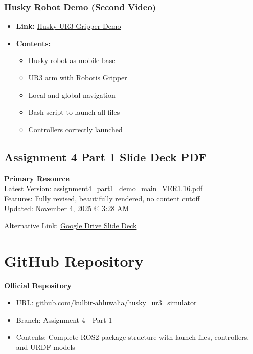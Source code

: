 \documentclass[11pt,a4paper]{article}
\begin{document}
\subsubsection{Husky Robot Demo (Second Video)}
\begin{itemize}
    \item \textbf{Link:} \href{https://drive.google.com/file/d/1FVhyBrrrvM0TzXG092dVYTzzvB7eGf9Y/view?usp=sharing}{Husky UR3 Gripper Demo}
    \item \textbf{Contents:}
    \begin{itemize}[nosep]
        \item Husky robot as mobile base
        \item UR3 arm with Robotis Gripper
        \item Local and global navigation
        \item Bash script to launch all files
        \item Controllers correctly launched
    \end{itemize}
\end{itemize}

\subsection{Assignment 4 Part 1 Slide Deck PDF}

\begin{warningbox}
\textbf{Primary Resource}\\
Latest Version: \href{https://files.campuswire.com/e08a84bd-8041-4768-9519-4e549f2b26e8/d555c87a-c092-4ebc-8ce1-97fc9bfbec64/assignment4_part1_demo_main_VER1.16_PDF_ASSIGNMENT4.pdf}{assignment4\_part1\_demo\_main\_VER1.16.pdf}\\
Features: Fully revised, beautifully rendered, no content cutoff\\
Updated: November 4, 2025 @ 3:28 AM
\end{warningbox}

Alternative Link: \href{https://drive.google.com/file/d/1ohlPm3fGtu99IuSKNHaQ0uCQNHpwxsMg/view?usp=sharing}{Google Drive Slide Deck}

\section{GitHub Repository}

\begin{infobox}
\textbf{Official Repository}
\begin{itemize}[nosep]
    \item URL: \href{https://github.com/kulbir-ahluwalia/husky_ur3_simulator}{github.com/kulbir-ahluwalia/husky\_ur3\_simulator}
    \item Branch: Assignment 4 - Part 1
    \item Contents: Complete ROS2 package structure with launch files, controllers, and URDF models
\end{itemize}
\end{infobox}
\end{document}
